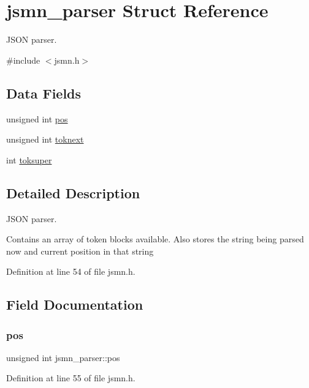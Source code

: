 \hypertarget{structjsmn__parser}{}\section{jsmn\+\_\+parser Struct Reference}
\label{structjsmn__parser}


J\+S\+ON parser.  




{\ttfamily \#include $<$jsmn.\+h$>$}

\subsection*{Data Fields}
\begin{DoxyCompactItemize}
\item 
unsigned int \hyperlink{structjsmn__parser_a3d0d6e48d3d5b24262f9e0c2241dc456}{pos}
\item 
unsigned int \hyperlink{structjsmn__parser_af640efd7d154218124a964b65f114bff}{toknext}
\item 
int \hyperlink{structjsmn__parser_af11fcec48d9f1298909777a12f1d1e39}{toksuper}
\end{DoxyCompactItemize}


\subsection{Detailed Description}
J\+S\+ON parser. 

Contains an array of token blocks available. Also stores the string being parsed now and current position in that string 

Definition at line 54 of file jsmn.\+h.



\subsection{Field Documentation}
\hypertarget{structjsmn__parser_a3d0d6e48d3d5b24262f9e0c2241dc456}{}\label{structjsmn__parser_a3d0d6e48d3d5b24262f9e0c2241dc456} 
\subsubsection{\texorpdfstring{pos}{pos}}
{\footnotesize\ttfamily unsigned int jsmn\+\_\+parser\+::pos}



Definition at line 55 of file jsmn.\+h.

